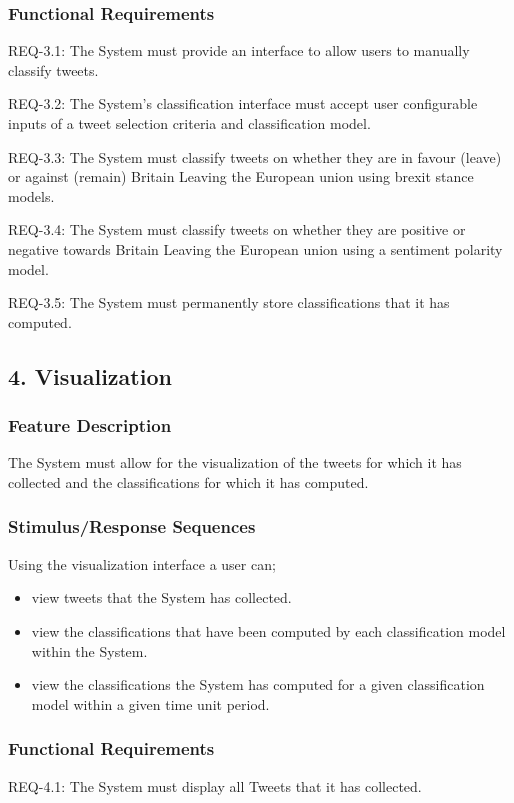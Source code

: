 \documentclass[11pt]{report}
\begin{document}
\subsubsection*{Functional Requirements}
REQ-3.1: The System must provide an interface to allow users to manually classify tweets.

REQ-3.2: The System's classification interface must accept user configurable inputs of a tweet selection criteria and classification model.

REQ-3.3: The System must classify tweets on whether they are in favour (leave) or against (remain)  Britain Leaving the European union using brexit stance models.

REQ-3.4: The System must classify tweets on whether they are positive or negative towards Britain Leaving the European union using a sentiment polarity model.

REQ-3.5: The System must permanently store classifications that it has computed.


\subsection*{4. Visualization}
\subsubsection*{Feature Description}
The System must allow for the visualization of the tweets for which it has collected and the classifications for which it has computed.
\subsubsection*{Stimulus/Response Sequences}
Using the visualization interface a user can; 
\begin{itemize}
\item view tweets that the System has collected.
\item view the classifications that have been computed by each classification model within the System.
\item view the classifications the System has computed for a given classification model within a given time unit period.
\end{itemize}
\subsubsection*{Functional Requirements}
REQ-4.1: The System must display all Tweets that it has collected.
\end{document}
